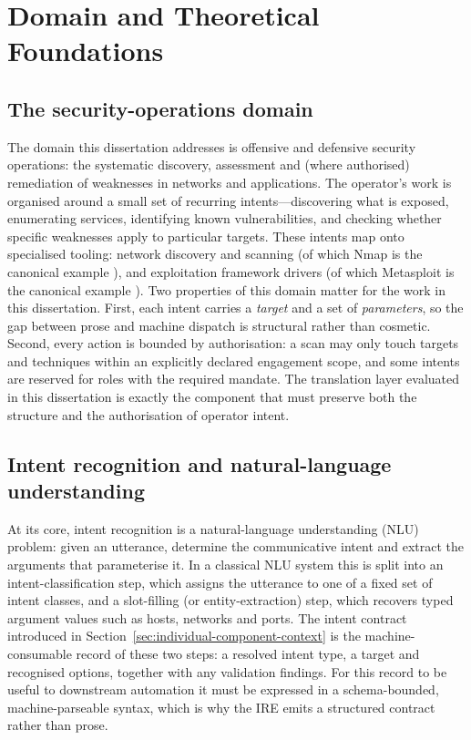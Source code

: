 \section{Domain and Theoretical Foundations}\label{sec:domain-foundations}

\subsection*{The security-operations domain}

The domain this dissertation addresses is offensive and defensive security
operations: the systematic discovery, assessment and (where authorised)
remediation of weaknesses in networks and applications. The operator's work is
organised around a small set of recurring intents---discovering what is
exposed, enumerating services, identifying known vulnerabilities, and checking
whether specific weaknesses apply to particular targets. These intents map onto
specialised tooling: network discovery and scanning (of which Nmap is the
canonical example \parencite{lyon2009nmap}), and exploitation framework
drivers (of which Metasploit is the canonical example \parencite{metasploit}).
Two properties of this domain matter for the work in this dissertation. First,
each intent carries a \emph{target} and a set of \emph{parameters}, so the gap
between prose and machine dispatch is structural rather than cosmetic. Second,
every action is bounded by authorisation: a scan may only touch targets and
techniques within an explicitly declared engagement scope, and some intents are
reserved for roles with the required mandate. The translation layer evaluated
in this dissertation is exactly the component that must preserve both the
structure and the authorisation of operator intent.

\subsection*{Intent recognition and natural-language understanding}

At its core, intent recognition is a natural-language understanding (NLU)
problem: given an utterance, determine the communicative intent and extract the
arguments that parameterise it. In a classical NLU system this is split into an
intent-classification step, which assigns the utterance to one of a fixed set
of intent classes, and a slot-filling (or entity-extraction) step, which
recovers typed argument values such as hosts, networks and ports. The intent
contract introduced in Section~\ref{sec:individual-component-context} is the
machine-consumable record of these two steps: a resolved intent type, a target
and recognised options, together with any validation findings. For this record
to be useful to downstream automation it must be expressed in a
schema-bounded, machine-parseable syntax, which is why the IRE emits a
structured contract rather than prose.

